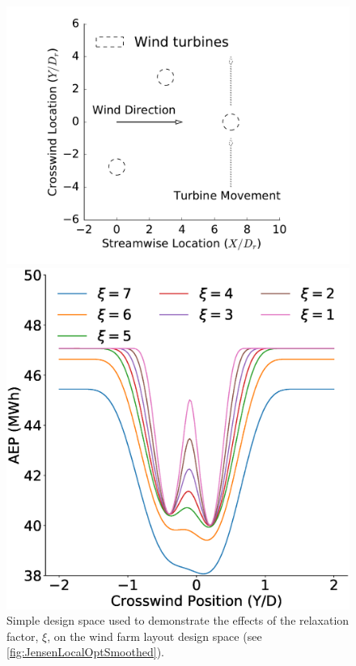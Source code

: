 \documentclass[a4paper]{jpconf}
\begin{document}
\begin{figure}[ht]
	\centering
	\begin{minipage}[t]{0.43\textwidth}
		\centering
		\includegraphics[width=\textwidth, trim={2cm 0cm 2cm 0cm}, clip]{smoothing_locations}
		\caption{Simple design space used to demonstrate the effects of the relaxation factor, $\xi$, on the wind farm layout design space (see \cref{fig:JensenLocalOptSmoothed}).}
		\label{fig:smoothing_locations_Jensen}
	\end{minipage}\hspace{1pc}
	\begin{minipage}[t]{0.52\textwidth}
		\centering
		\includegraphics[width=\textwidth]{JensenWECMultipleTurbinesAEP}

\end{minipage}
\end{figure}
\end{document}

